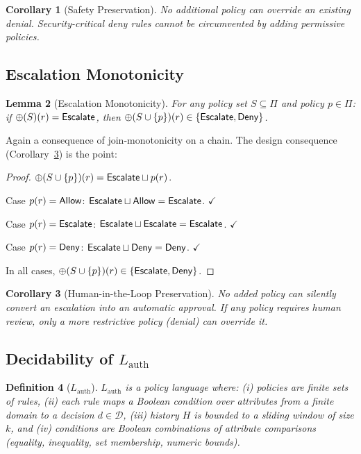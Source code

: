 \documentclass[11pt,a4paper]{article}
\newtheorem{definition}{Definition}[section]
\newtheorem{corollary}[definition]{Corollary}
\newtheorem{lemma}[definition]{Lemma}
\newcommand{\termlabel}[1]{\ifmmode\mathsf{#1}\else{\normalfont\textsc{\MakeLowercase{#1}}}\fi}
\newcommand{\Allow}{\termlabel{Allow}}
\newcommand{\Deny}{\termlabel{Deny}}
\newcommand{\Escalate}{\termlabel{Escalate}}
\begin{document}
\begin{corollary}[Safety Preservation]
\label{cor:safety}
No additional policy can override an existing denial. Security-critical deny rules cannot be circumvented by adding permissive policies.
\end{corollary}

\subsection{Escalation Monotonicity}

\begin{lemma}[Escalation Monotonicity]
\label{thm:escalation}
For any policy set $S \subseteq \Pi$ and policy $p \in \Pi$: if $\oplus(S)(r) = \Escalate$, then $\oplus(S \cup \{p\})(r) \in \{\Escalate, \Deny\}$.
\end{lemma}

\noindent Again a consequence of join-monotonicity on a chain. The design consequence (Corollary~\ref{cor:hitl}) is the point:

\begin{proof}
$\oplus(S \cup \{p\})(r) = \Escalate \sqcup p(r)$.

\noindent Case $p(r) = \Allow$: $\Escalate \sqcup \Allow = \Escalate$. $\checkmark$

\noindent Case $p(r) = \Escalate$: $\Escalate \sqcup \Escalate = \Escalate$. $\checkmark$

\noindent Case $p(r) = \Deny$: $\Escalate \sqcup \Deny = \Deny$. $\checkmark$

\noindent In all cases, $\oplus(S \cup \{p\})(r) \in \{\Escalate, \Deny\}$.
\end{proof}

\begin{corollary}[Human-in-the-Loop Preservation]
\label{cor:hitl}
No added policy can silently convert an escalation into an automatic approval. If any policy requires human review, only a more restrictive policy (denial) can override it.
\end{corollary}

\subsection{Decidability of \texorpdfstring{$L_{\mathrm{auth}}$}{L\_auth}}

\begin{definition}[$L_{\mathrm{auth}}$]
\label{def:lauth}
$L_{\mathrm{auth}}$ is a policy language where: (i) policies are finite sets of rules, (ii) each rule maps a Boolean condition over attributes from a finite domain to a decision $d \in \mathcal{D}$, (iii) history $H$ is bounded to a sliding window of size $k$, and (iv) conditions are Boolean combinations of attribute comparisons (equality, inequality, set membership, numeric bounds).
\end{definition}
\end{document}
